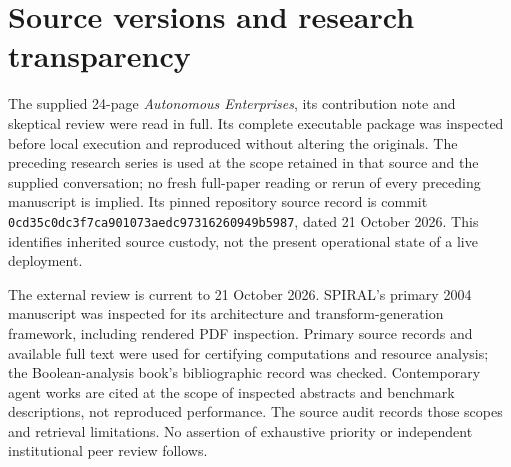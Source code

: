 \documentclass[11pt,letterpaper]{article}
\theoremstyle{definition}\newtheorem{definition}[theorem]{Definition}
\theoremstyle{remark}\newtheorem{remark}[theorem]{Remark}
\begin{document}
\section{Source versions and research transparency}
The supplied 24-page \emph{Autonomous Enterprises}, its contribution note and skeptical review were read in full. Its complete executable package was inspected before local execution and reproduced without altering the originals. The preceding research series is used at the scope retained in that source and the supplied conversation; no fresh full-paper reading or rerun of every preceding manuscript is implied. Its pinned repository source record is commit \texttt{0cd35c0dc3f7ca901073aedc97316260949b5987}, dated 21 October 2026. This identifies inherited source custody, not the present operational state of a live deployment.

The external review is current to 21 October 2026. SPIRAL's primary 2004 manuscript was inspected for its architecture and transform-generation framework, including rendered PDF inspection. Primary source records and available full text were used for certifying computations and resource analysis; the Boolean-analysis book's bibliographic record was checked. Contemporary agent works are cited at the scope of inspected abstracts and benchmark descriptions, not reproduced performance. The source audit records those scopes and retrieval limitations. No assertion of exhaustive priority or independent institutional peer review follows.
\end{document}
